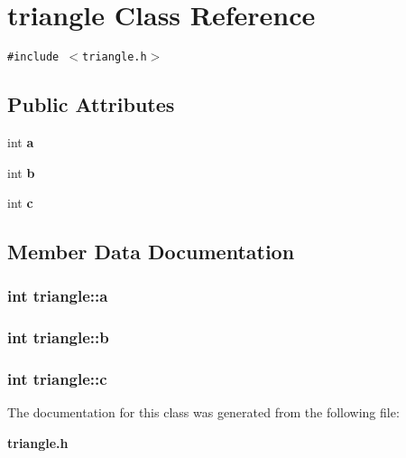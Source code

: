 \section{triangle Class Reference}
\label{classtriangle}
{\tt \#include $<$triangle.h$>$}

\subsection*{Public Attributes}
\begin{CompactItemize}
\item 
int {\bf a}
\item 
int {\bf b}
\item 
int {\bf c}
\end{CompactItemize}


\subsection{Member Data Documentation}
\subsubsection[{a}]{\setlength{\rightskip}{0pt plus 5cm}int {\bf triangle::a}}\label{classtriangle_340b2485aa1ed76572a2980f873cfaa2}


\subsubsection[{b}]{\setlength{\rightskip}{0pt plus 5cm}int {\bf triangle::b}}\label{classtriangle_8b581b74579c237bb7988d4e4e6bb377}


\subsubsection[{c}]{\setlength{\rightskip}{0pt plus 5cm}int {\bf triangle::c}}\label{classtriangle_2b3ee36792f25bf2a29b2db2683badce}




The documentation for this class was generated from the following file:\begin{CompactItemize}
\item 
{\bf triangle.h}\end{CompactItemize}
